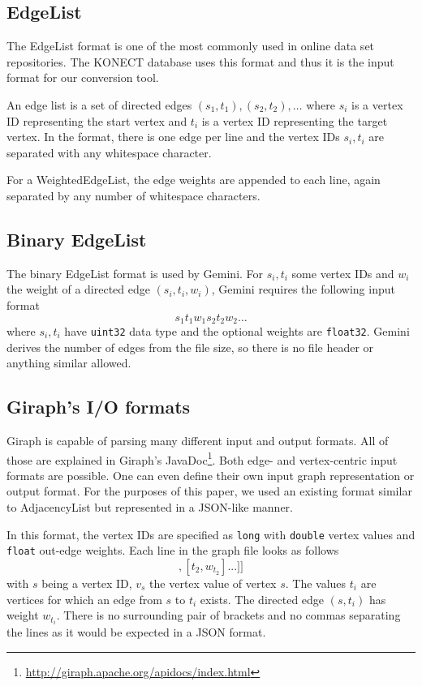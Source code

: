 \subsection{EdgeList}
The EdgeList format is one of the most commonly used in online data set repositories. The KONECT database uses this format and thus it is the input format for our conversion tool.

An edge list is a set of directed edges $(s_1,t_1),(s_2,t_2),\ldots$ where $s_i$ is a vertex ID representing the start vertex and $t_i$ is a vertex ID representing the target vertex.
In the format, there is one edge per line and the vertex IDs $s_i, t_i$ are separated with any whitespace character.

For a WeightedEdgeList, the edge weights are appended to each line, again separated by any number of whitespace characters.

\subsection{Binary EdgeList}
The binary EdgeList format is used by Gemini.
For $s_i, t_i$ some vertex IDs and $w_i$ the weight of a directed edge $(s_i,t_i, w_i)$, Gemini requires the following input format
\begin{equation*}
	s_1t_1w_1s_2t_2w_2\ldots
\end{equation*}
where $s_i,t_i$ have \texttt{uint32} data type and the optional weights are \texttt{float32}.
Gemini derives the number of edges from the file size, so there is no file header or anything similar allowed.

\subsection{Giraph's I/O formats}
Giraph is capable of parsing many different input and output formats. All of those are explained in Giraph's JavaDoc\footnote{\url{http://giraph.apache.org/apidocs/index.html}}.
Both edge- and vertex-centric input formats are possible.
One can even define their own input graph representation or output format. For the purposes of this paper, we used an existing format similar to AdjacencyList but represented in a JSON-like manner.

In this format, the vertex IDs are specified as \texttt{long} with \texttt{double} vertex values and \texttt{float} out-edge weights.
Each line in the graph file looks as follows
\begin{equation*}
	[s,v_s,[[t_1, w_{t_1}], [t_2, w_{t_2}]...]]
\end{equation*}
with $s$ being a vertex ID, $v_s$ the vertex value of vertex $s$. The values $t_i$ are vertices for which an edge from $s$ to $t_i$ exists. The directed edge $(s,t_i)$ has weight $w_{t_i}$.
There is no surrounding pair of brackets and no commas separating the lines as it would be expected in a JSON format.
